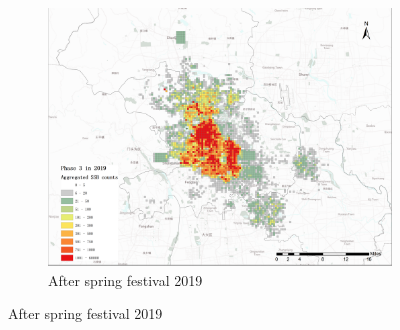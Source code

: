 \documentclass[preprints,ijgi,submit,moreauthors]{Definitions/mdpi}
\begin{document}
\begin{figure}[H]
\begin{subfigure}{.3\textwidth}
        \includegraphics[width=\textwidth]{Figures/2019phase3(1).png}
        \caption{After spring festival 2019}
    \end{subfigure}
    

\end{figure}
\end{document}
